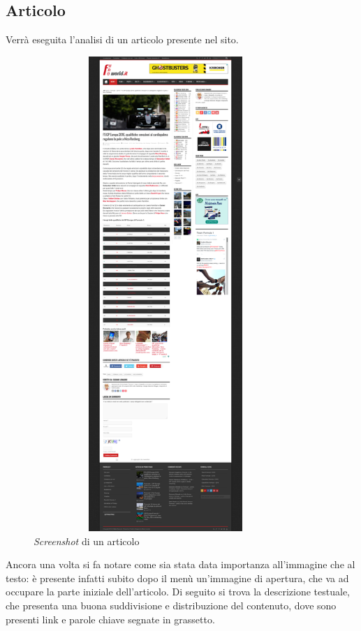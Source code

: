 \subsection{Articolo}
Verr\`a eseguita l'analisi di un articolo presente nel sito.

\begin{figure}[H] %
  \centering
  \includegraphics[height=18cm, width=10cm]{res/img/Article}
  \caption{\textit{Screenshot} di un articolo}
\end{figure}

Ancora una volta si fa notare come sia stata data importanza all'immagine che al
testo: è presente infatti subito dopo il menù un'immagine di apertura, che va
ad occupare la parte iniziale dell'articolo.
Di seguito si trova la descrizione testuale, che presenta una buona suddivisione
e distribuzione del contenuto, dove sono presenti link e parole chiave segnate
in grassetto.

